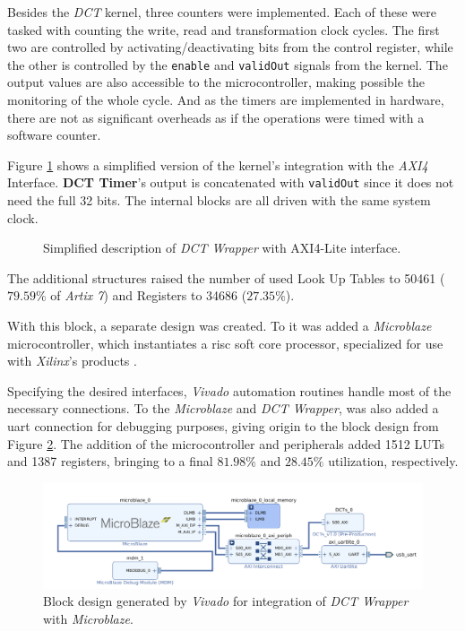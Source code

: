 Besides the \emph{DCT} kernel, three counters were implemented. Each of these were tasked with counting the write, read and transformation clock cycles. The first two are controlled by activating/deactivating bits from the control register, while the other is controlled by the \texttt{enable} and \texttt{validOut} signals from the kernel. The output values are also accessible to the microcontroller, making possible the monitoring of the whole cycle. And as the timers are implemented in hardware, there are not as significant overheads as if the operations were timed with a software counter.

Figure \ref{fig:axi4int} shows a simplified version of the kernel's integration with the \emph{AXI4} Interface. \textbf{DCT Timer}'s output is concatenated with \texttt{validOut} since it does not need the full 32 bits. The internal blocks are all driven with the same system clock.

\begin{figure}[!htb]
    \centering
    
    \caption{Simplified description of \emph{DCT Wrapper} with AXI4-Lite interface.}
    \label{fig:axi4int}
\end{figure}

The additional structures raised the number of used Look Up Tables to 50461 ($79.59\%$ of \emph{Artix 7}) and Registers to 34686 ($27.35\%$).


With this block, a separate design was created. To it was added a \emph{Microblaze} microcontroller, which instantiates a \gls{risc} soft core processor, specialized for use with \emph{Xilinx}'s products \cite{MicroBlazeProcessorReference2019a}. 

Specifying the desired interfaces, \emph{Vivado} automation routines handle most of the necessary connections. To the \emph{Microblaze} and \emph{DCT Wrapper}, was also added a \gls{uart} connection for debugging purposes, giving origin to the block design from Figure \ref{fig:blockdes}. The addition of the microcontroller and peripherals added 1512 LUTs and 1387 registers, bringing to a final $81.98\%$ and $28.45\%$ utilization, respectively.

\begin{figure}[!htb]
    \centering
    \includegraphics[width=\textwidth]{Sections/4DevelopedArchitecture/Figures/DCTCop.png}
    \caption{Block design generated by \emph{Vivado} for integration of \emph{DCT Wrapper} with \emph{Microblaze}.}
    \label{fig:blockdes}
\end{figure}

